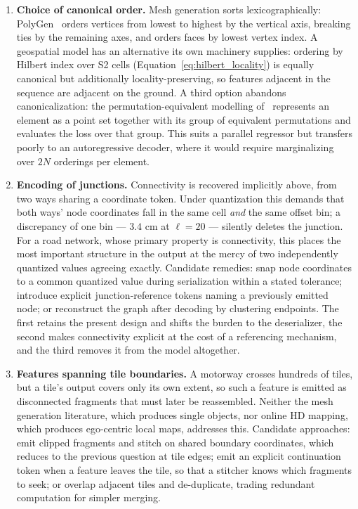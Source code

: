 \documentclass{book}
\begin{document}
\begin{enumerate}
\item \textbf{Choice of canonical order.}  Mesh generation sorts
  lexicographically: PolyGen~\cite{nash2020polygen} orders
  vertices from lowest to highest by the vertical axis, breaking
  ties by the remaining axes, and orders faces by lowest vertex
  index.  A geospatial model has an alternative its own
  machinery supplies: ordering by Hilbert index over S2 cells
  (Equation~\eqref{eq:hilbert_locality}) is equally canonical but
  additionally locality-preserving, so features adjacent in the
  sequence are adjacent on the ground.  A third option abandons
  canonicalization: the permutation-equivalent modelling
  of~\cite{liao2022maptr} represents an element as a point set
  together with its group of equivalent permutations and
  evaluates the loss over that group.  This suits a parallel
  regressor but transfers poorly to an autoregressive decoder,
  where it would require marginalizing over $2N$ orderings per
  element.

\item \textbf{Encoding of junctions.}  Connectivity is recovered
  implicitly above, from two ways sharing a coordinate token.
  Under quantization this demands that both ways' node
  coordinates fall in the same cell \emph{and} the same offset
  bin; a discrepancy of one bin --- $3.4$ cm at $\ell = 20$ ---
  silently deletes the junction.  For a road network, whose
  primary property is connectivity, this places the most
  important structure in the output at the mercy of two
  independently quantized values agreeing exactly.  Candidate
  remedies: snap node coordinates to a common quantized value
  during serialization within a stated tolerance; introduce
  explicit junction-reference tokens naming a previously emitted
  node; or reconstruct the graph after decoding by clustering
  endpoints.  The first retains the present design and shifts the
  burden to the deserializer, the second makes connectivity
  explicit at the cost of a referencing mechanism, and the third
  removes it from the model altogether.

\item \textbf{Features spanning tile boundaries.}  A motorway
  crosses hundreds of tiles, but a tile's output covers only its
  own extent, so such a feature is emitted as disconnected
  fragments that must later be reassembled.  Neither the mesh
  generation literature, which produces single objects, nor
  online HD mapping, which produces ego-centric local maps,
  addresses this.  Candidate approaches: emit clipped fragments
  and stitch on shared boundary coordinates, which reduces to the
  previous question at tile edges; emit an explicit continuation
  token when a feature leaves the tile, so that a stitcher knows
  which fragments to seek; or overlap adjacent tiles and
  de-duplicate, trading redundant computation for simpler
  merging.


\end{enumerate}
\end{document}
